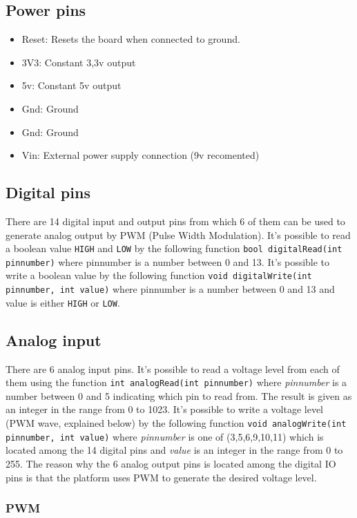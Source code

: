 \documentclass[a4paper,oneside, draft]{memoir}
\begin{document}
\subsection{Power pins}
\begin{itemize}
\item Reset: Resets the board when connected to ground. 
\item 3V3: Constant 3,3v output
\item 5v: Constant 5v output
\item Gnd: Ground
\item Gnd: Ground
\item Vin: External power supply connection (9v recomented)
\end{itemize}

\subsection{Digital pins}
There are 14 digital input and output pins from which 6 of them can be
used to generate analog output by PWM (Pulse Width Modulation). It's
possible to read a boolean value \texttt{HIGH} and \texttt{LOW} by the
following function \texttt{bool digitalRead(int pinnumber)} where
pinnumber is a number between 0 and 13. It's possible to write a
boolean value by the following function \texttt{void digitalWrite(int
  pinnumber, int value)} where pinnumber is a number between 0 and 13
and value is either \texttt{HIGH} or \texttt{LOW}.

\subsection{Analog input}
There are 6 analog input pins. It's possible to read a voltage level
from each of them using the function \texttt{int analogRead(int
  pinnumber)} where \textit{pinnumber} is a number between 0 and 5
indicating which pin to read from. The result is given as an integer
in the range from 0 to 1023. It's possible to write a voltage level
(PWM wave, explained below) by the following function \texttt{void
  analogWrite(int pinnumber, int value)} where \textit{pinnumber} is
one of (3,5,6,9,10,11) which is located among the 14 digital pins and
\textit{value} is an integer in the range from 0 to 255. The reason
why the 6 analog output pins is located among the digital IO pins is
that the platform uses PWM to generate the desired voltage level.

\subsubsection{PWM}
\end{document}

